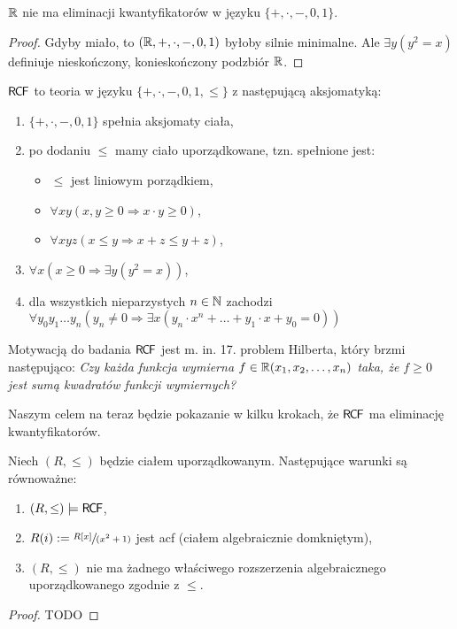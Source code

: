 \documentclass{article}
\begin{document}

\begin{stw}
	 $ \mathbb{R} $ nie ma eliminacji kwantyfikatorów w języku $ \{+, \cdot, -, 0, 1\} $. %
\end{stw}
\begin{proof}
	Gdyby miało, to $ (\mathbb{R}, +, \cdot, -, 0, 1) $ byłoby silnie minimalne.
	Ale $\exists y (y^2 = x) $ definiuje nieskończony, konieskończony podzbiór $ \mathbb{R} $.
\end{proof}

\begin{df}
	 $ \mathsf{R \mkern-1.7mu C \mkern-1.4mu F} $ to teoria w języku $ \{ +, \cdot, -, 0, 1, \leq \} $ z następującą aksjomatyką:
	 \begin{enumerate}
		 \item $ \{+, \cdot, -, 0, 1\} $ spełnia aksjomaty ciała,
		 \item po dodaniu $\leq $ mamy ciało uporządkowane, tzn. spełnione jest:
			 \begin{itemize}
				 \item $ \leq $ jest liniowym porządkiem,
				 \item $ \forall x y (x, y \geq 0 \Rightarrow x\cdot y \geq 0) $,
				 \item $\forall x y z (x \leq y \Rightarrow x + z \leq y + z )  $,
			 \end{itemize}

		 \item $ \forall x (x \geq 0 \Rightarrow \exists y ( y^2 = x )) $,
		 \item dla wszystkich nieparzystych $ n \in \mathbb{N}$ zachodzi $ \forall y_0 y_1 \ldots y_n (y_n \neq 0 \Rightarrow \exists x (y_n \cdot x^n + \ldots + y_1 \cdot x + y_0 = 0)) $
	 \end{enumerate}

\end{df}

Motywacją do badania $ \mathsf{R \mkern-1.7mu C \mkern-1.4mu F} $ jest m. in. 17. problem Hilberta, który brzmi następująco:
\textit{Czy każda funkcja wymierna $ f \in \mathbb{R}(x_1, x_2, \ldots, x_n ) $ taka, że $ f \geq 0 $ jest sumą kwadratów funkcji wymiernych?}

Naszym celem na teraz będzie pokazanie w kilku krokach, że $ \mathsf{R \mkern-1.7mu C \mkern-1.4mu F} $ ma eliminację kwantyfikatorów.

\begin{tw}
	 Niech $ (R, \leq) $ będzie ciałem uporządkowanym.
	 Następujące warunki są równoważne:
	 \begin{enumerate}
		 \item $(R, \leq) \models \mathsf{R \mkern-1.7mu C \mkern-1.4mu F} $,
		 \item $R(i) := \sfrac{R[x]}{(x^2 + 1)} $ jest acf (ciałem algebraicznie domkniętym),
		 \item $ (R, \leq) $ nie ma żadnego właściwego rozszerzenia algebraicznego uporządkowanego zgodnie z $ \leq $.
	 \end{enumerate}

\end{tw}
\begin{proof}
	 TODO
\end{proof}
\end{document}
